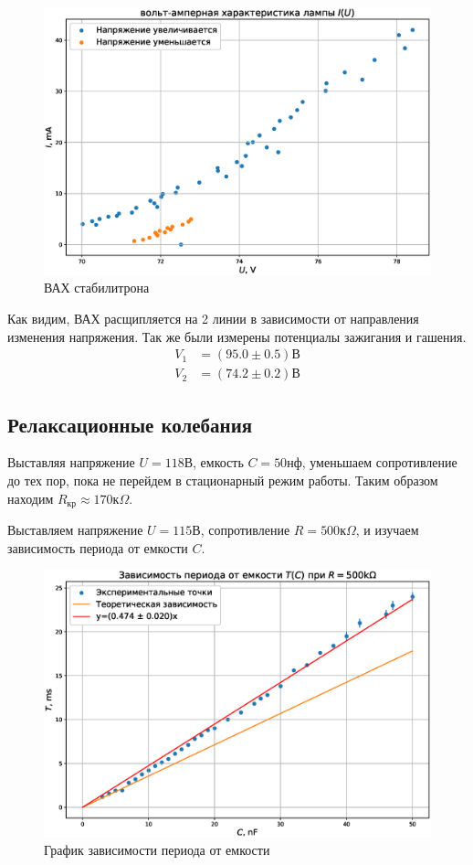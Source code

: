 \documentclass{article}
\begin{document}
\begin{figure}[h]
    \center\includegraphics[width = 0.80\linewidth]{stab_IU}
    \caption{ВАХ стабилитрона}
\end{figure}

Как видим, ВАХ расщипляется на 2 линии в зависимости от направления изменения
напряжения. Так же были измерены потенциалы зажигания и гашения.
\begin{align*}
    V_1 &= (95.0 \pm 0.5)В\\
    V_2 &= (74.2 \pm 0.2)В
\end{align*}

\subsection{Релаксационные колебания}

Выставляя напряжение $U=118В$, емкость $C=50нф$, уменьшаем сопротивление до тех пор,
пока не перейдем в стационарный режим работы. Таким образом находим
$R_{кр}\approx170к\Omega$.

Выставляем напряжение $U=115В$, сопротивление $R=500к\Omega$, и изучаем зависимость
периода от емкости $C$.

\begin{figure}[h]
    \center\includegraphics[width = 1\linewidth]{T_C}
    \caption{График зависимости периода от емкости}
\end{figure}
\end{document}
